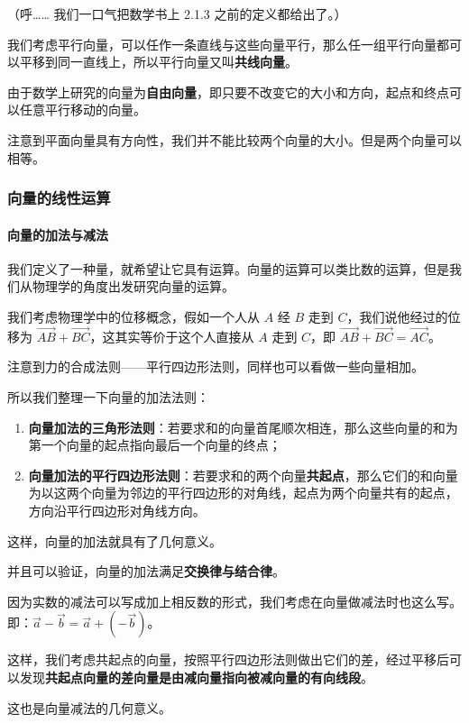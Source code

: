 （呼…… 我们一口气把数学书上 2.1.3 之前的定义都给出了。）

我们考虑平行向量，可以任作一条直线与这些向量平行，那么任一组平行向量都可以平移到同一直线上，所以平行向量又叫\textbf{共线向量}。

由于数学上研究的向量为\textbf{自由向量}，即只要不改变它的大小和方向，起点和终点可以任意平行移动的向量。

注意到平面向量具有方向性，我们并不能比较两个向量的大小。但是两个向量可以相等。

\subsubsection{向量的线性运算}

\paragraph{向量的加法与减法}

我们定义了一种量，就希望让它具有运算。向量的运算可以类比数的运算，但是我们从物理学的角度出发研究向量的运算。

我们考虑物理学中的位移概念，假如一个人从 $A$ 经 $B$ 走到 $C$，我们说他经过的位移为 $\vec{AB}+\vec{BC}$，这其实等价于这个人直接从 $A$ 走到 $C$，即 $\vec{AB}+\vec{BC}=\vec{AC}$。

注意到力的合成法则——平行四边形法则，同样也可以看做一些向量相加。

所以我们整理一下向量的加法法则：

\begin{enumerate}
\item \textbf{向量加法的三角形法则}：若要求和的向量首尾顺次相连，那么这些向量的和为第一个向量的起点指向最后一个向量的终点；
\item \textbf{向量加法的平行四边形法则}：若要求和的两个向量\textbf{共起点}，那么它们的和向量为以这两个向量为邻边的平行四边形的对角线，起点为两个向量共有的起点，方向沿平行四边形对角线方向。
\end{enumerate}

这样，向量的加法就具有了几何意义。

并且可以验证，向量的加法满足\textbf{交换律与结合律}。

因为实数的减法可以写成加上相反数的形式，我们考虑在向量做减法时也这么写。即：$\vec a-\vec b=\vec a+(-\vec b)$。

这样，我们考虑共起点的向量，按照平行四边形法则做出它们的差，经过平移后可以发现\textbf{共起点向量的差向量是由减向量指向被减向量的有向线段}。

这也是向量减法的几何意义。

